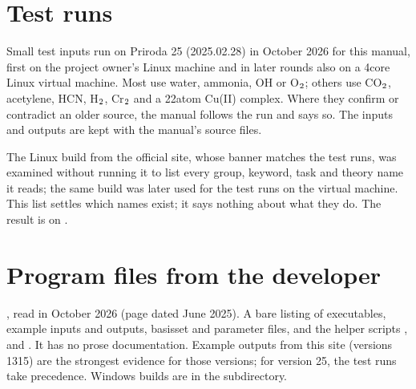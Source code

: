 \documentclass[letterpaper,10pt,english,openany,oneside]{sphinxmanual}
\begin{document}
\section{Test runs}
\label{\detokenize{sources:test-runs}}\begin{description}
\sphinxAtStartPar
Small test inputs run on Priroda 25 (2025.02.28) in October 2026 for this manual, first on the project owner’s
Linux machine and in later rounds also on a 4\sphinxhyphen{}core Linux virtual machine. Most use water, ammonia, OH or O\(\sb{\text{2}}\);
others use CO\(\sb{\text{2}}\), acetylene, HCN, H\(\sb{\text{2}}\), Cr\(\sb{\text{2}}\) and a 22\sphinxhyphen{}atom Cu(II) complex. Where they confirm or contradict an older
source, the manual follows the run and says so. The inputs and outputs are kept with the manual’s source files.



\sphinxAtStartPar
The Linux build  from the official site, whose banner matches the test runs, was examined without running
it to list every group, keyword, task and theory name it reads; the same build was later used for the test runs
on the virtual machine. This list settles which names exist; it says nothing about what they do. The result is
on {\hyperref[\detokenize{binary-keywords:binary-keywords}]{}}.

\end{description}


\section{Program files from the developer}
\label{\detokenize{sources:program-files-from-the-developer}}\begin{description}
\sphinxAtStartPar
{}, read in October 2026 (page dated June 2025). A bare listing of executables,
example inputs and outputs, basis\sphinxhyphen{}set and parameter files, and the helper scripts ,  and . It has no
prose documentation. Example outputs from this site (versions 13\textendash{}15) are the strongest evidence for those
versions; for version 25, the test runs take precedence.
Windows builds are in the  subdirectory.

\end{description}
\end{document}
